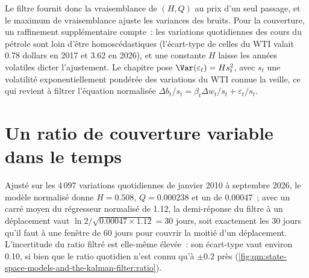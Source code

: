 Le filtre fournit donc la vraisemblance de $(H, Q)$ au prix d'un seul passage, et le maximum de vraisemblance ajuste les variances des bruits. Pour la couverture, un raffinement supplémentaire
compte~: les variations quotidiennes des cours du pétrole sont loin d'être homoscédastiques (l'écart-type de celles du WTI valait 0.78 dollars en 2017 et 3.62 en 2026), et une
constante $H$ laisse les années volatiles dicter l'ajustement. Le chapitre pose $\Var(\varepsilon_t) = H s_t^2$, avec $s_t$ une volatilité exponentiellement pondérée des
variations du WTI connue la veille, ce qui revient à filtrer l'équation normalisée $\Delta b_t/s_t = \beta_t\Delta w_t/s_t + \varepsilon_t/s_t$.

\section{Un ratio de couverture variable dans le temps}

Ajusté sur les 4\,097 variations quotidiennes de janvier 2010 à septembre 2026, le modèle normalisé donne $H = 0.508$, $Q = 0.000238$ et un  de
0.00047~; avec un carré moyen du régresseur normalisé de 1.12, la demi-réponse du filtre à un déplacement vaut $\ln2/\sqrt{0.00047 \times 1.12} = 30$ jours, soit exactement les
30 jours qu'il faut à une fenêtre de 60 jours pour couvrir la moitié d'un déplacement. L'incertitude du ratio filtré est elle-même élevée~: son écart-type vaut environ 0.10, si bien que le ratio quotidien
n'est connu qu'à $\pm 0.2$ près (\cref{fig:qm:state-space-models-and-the-kalman-filter:ratio}).

